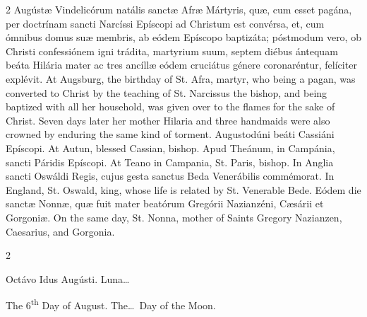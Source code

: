 \begin{paracol}{2}
Augústæ Vindelicórum 
 natális sanctæ Afræ Mártyris, quæ, cum esset pagána, per doctrínam sancti 
 Narcíssi Epíscopi ad Christum est convérsa, et, cum ómnibus domus suæ 
 membris, ab eódem Epíscopo baptizáta; póstmodum vero, ob Christi 
 confessiónem igni trádita, martyrium suum, septem diébus ántequam beáta 
 Hilária mater ac tres ancíllæ eódem cruciátus génere coronaréntur, felíciter 
 explévit.
\switchcolumn
{}
At Augsburg, the birthday of St. 
 Afra, martyr, who being a pagan, was converted to Christ by the teaching of 
 St. Narcissus the bishop, and being baptized with all her household, was 
 given over to the flames for the sake of Christ. Seven days later her 
 mother Hilaria and three handmaids were also crowned by enduring the same 
 kind of torment.
\switchcolumn*
{}
Augustodúni beáti 
 Cassiáni Epíscopi.
\switchcolumn
{}
At Autun, blessed Cassian, bishop.
\switchcolumn*
{}
Apud Theánum, in 
 Campánia, sancti Páridis Epíscopi.
\switchcolumn
{}
At Teano in Campania, St. Paris, 
 bishop.
\switchcolumn*
{}
In Anglia sancti 
 Oswáldi Regis, cujus gesta sanctus Beda Venerábilis commémorat.
\switchcolumn
{}
In England, St. Oswald, king, whose 
 life is related by St. Venerable Bede.
\switchcolumn*
{}
Eódem die sanctæ Nonnæ, 
 quæ fuit mater beatórum Gregórii Nazianzéni, Cæsárii et Gorgoniæ.
\switchcolumn
{}
On the same day, St. Nonna, mother 
 of Saints Gregory Nazianzen, Caesarius, and Gorgonia.
\switchcolumn*
{}
\end{paracol}


\begin{paracol}{2}
\begin{center}{\color{gregoriocolor} Octávo Idus Augústi. 
 Luna\dots\ }\end{center}
\switchcolumn
{}
\begin{center}{\color{gregoriocolor} The   6\textsuperscript{th} Day of 
 August. The\dots\ Day of the Moon.}\end{center}
\end{paracol}

